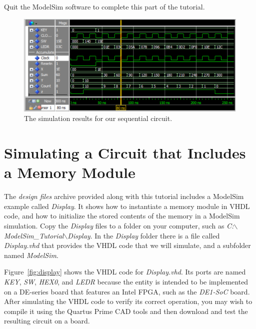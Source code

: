 \documentclass[11pt, twoside, pdftex]{article}
\begin{document}
\noindent
Quit the ModelSim software to complete this part of the tutorial.

\begin{figure}[h!]
	\begin{center}
		\includegraphics[width = \textwidth]{figures/gui3.png}
	\end{center}
		  \caption{The simulation results for our sequential circuit.}
	\label{fig:gui3}
\end{figure}

\section{Simulating a Circuit that Includes a Memory Module}

The {\it design files} archive provided along with this tutorial includes a ModelSim example 
called {\it Display}. It shows how to instantiate a memory module in VHDL code, and how
to initialize the stored contents of the memory in a ModelSim simulation. Copy the {\it Display}
files to a folder on your computer, such as 
{\it C:$\backslash$ModelSim\_Tutorial$\backslash$Display}. 
In the {\it Display} folder there is a file called {\it Display.vhd}
that provides the VHDL code that we will simulate, and 
a subfolder named {\it ModelSim}.

\noindent
Figure~\ref{fig:display} shows the VHDL code for {\it Display.vhd}.
Its ports are named {\it KEY}, {\it SW}, {\it HEX0}, and {\it LEDR} because the entity is intended 
to be implemented on a DE-series board that features an Intel FPGA, such as the {\it DE1-SoC}
board. After simulating the VHDL code to verify its correct operation, you may
wish to compile it using the Quartus Prime CAD tools and then download and test the 
resulting circuit on a board.  
\end{document}
